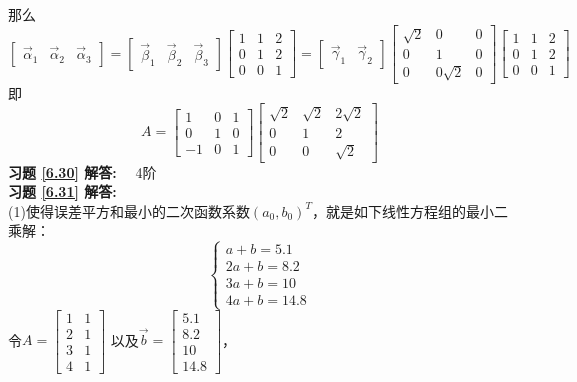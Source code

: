 那么
\begin{equation*}
\begin{bmatrix}\vec{\alpha}_1&\vec{\alpha}_2&\vec{\alpha}_3\end{bmatrix}=
\begin{bmatrix}\vec{\beta}_1&\vec{\beta}_2&\vec{\beta}_3\end{bmatrix}\begin{bmatrix}1&1&2\\0&1&2\\0&0&1\end{bmatrix}
=\begin{bmatrix}\vec{\gamma}_1&\vec{\gamma}_2\end{bmatrix}\begin{bmatrix}\sqrt{2}&0&0\\0&1&0\\0&0\sqrt{2}&0\end{bmatrix}
\begin{bmatrix}1&1&2\\0&1&2\\0&0&1\end{bmatrix}
\end{equation*}
即
\begin{equation*}
A=\begin{bmatrix}1&0&1\\0&1&0\\-1&0&1\end{bmatrix}
  \begin{bmatrix}\sqrt{2}&\sqrt{2}&2\sqrt{2}\\0&1&2\\0&0&\sqrt{2}\end{bmatrix}
\end{equation*}
\textbf{习题 \ref{6.30} 解答:}~~ 4阶\\
\textbf{习题 \ref{6.31} 解答:} \\
(1)使得误差平方和最小的二次函数系数$(a_0,b_0)^T$，就是如下线性方程组的最小二乘解：
\begin{equation*}
  \begin{cases}
  a+b=5.1\\
  2a+b=8.2\\
  3a+b=10\\
  4a+b=14.8
  \end{cases}
\end{equation*}
令$A=\begin{bmatrix}1&1\\2&1\\3&1\\4&1\end{bmatrix}$ 以及$\vec{b}=\begin{bmatrix}5.1\\8.2\\10\\14.8\end{bmatrix}$，
